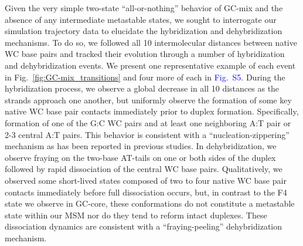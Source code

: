 \documentclass[journal=jpcbfk,manuscript=article]{achemso}
\newcommand*{\blauw}[1]{\textcolor{blue}{#1}}
\begin{document}
Given the very simple two-state ``all-or-nothing'' behavior of GC-mix and the absence of any intermediate metastable states, we sought to interrogate our simulation trajectory data to elucidate the hybridization and dehybridization mechanisms. To do so, we followed all 10 intermolecular distances between native WC base pairs and tracked their evolution through a number of hybridization and dehybridization events. We present one representative example of each event in Fig.~\ref{fig:GC-mix_transitions} and four more of each in \blauw{Fig.~S5}. During the hybridization process, we observe a global decrease in all 10 distances as the strands approach one another, but uniformly observe the formation of some key native WC base pair contacts immediately prior to duplex formation. Specifically, formation of one of the G:C WC pairs and at least one neighboring A:T pair or 2-3 central A:T pairs. This behavior is consistent with a ``nucleation-zippering'' mechanism as has been reported in previous studies.\citep{Wetmur1968KineticsDNA, Porschke1971CooperativeTransition, Sambriski2009SequencePathways,  Yin2011KineticsHybridization} In dehybridization, we observe fraying on the two-base AT-tails on one or both sides of the duplex followed by rapid dissociation of the central WC base pairs. Qualitatively, we observed some short-lived states composed of two to four native WC base pair contacts immediately before full dissociation occurs, but, in contrast to the F4 state we observe in GC-core, these conformations do not constitute a metastable state within our MSM nor do they tend to reform intact duplexes. These dissociation dynamics are consistent with a ``fraying-peeling'' dehybridization mechanism.\citep{Wong2008TheSimulations, Perez2010Real-timeUnfolding, Zgarbova2014BaseRNA} 
\end{document}
